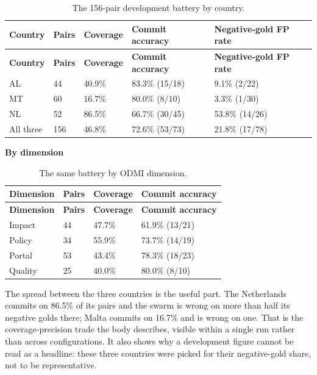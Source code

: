 {\small
\begin{longtable}[]{@{}
  L{0.1476}
  L{0.1082}
  L{0.1476}
  L{0.2952}
  L{0.2952}@{}}
\caption{The 156-pair development battery by country.}\label{tab:dev-by-country}\\
\toprule\noalign{}
\textbf{Country} & \textbf{Pairs} & \textbf{Coverage} & \textbf{Commit accuracy} & \textbf{Negative-gold FP rate} \\
\midrule\noalign{}
\endfirsthead
\toprule\noalign{}
\textbf{Country} & \textbf{Pairs} & \textbf{Coverage} & \textbf{Commit accuracy} & \textbf{Negative-gold FP rate} \\
\midrule\noalign{}
\endhead
\bottomrule\noalign{}
\endlastfoot
AL & 44 & 40.9\% & 83.3\% (15/18) & 9.1\% (2/22) \\
MT & 60 & 16.7\% & 80.0\% (8/10) & 3.3\% (1/30) \\
NL & 52 & 86.5\% & 66.7\% (30/45) & 53.8\% (14/26) \\
All three & 156 & 46.8\% & 72.6\% (53/73) & 21.8\% (17/78) \\
\end{longtable}
}


\textbf{By dimension}

{\small
\begin{longtable}[]{@{}
  L{0.1966}
  L{0.1376}
  L{0.1868}
  L{0.3932}@{}}
\caption{The same battery by ODMI dimension.}\label{tab:dev-by-dimension}\\
\toprule\noalign{}
\textbf{Dimension} & \textbf{Pairs} & \textbf{Coverage} & \textbf{Commit accuracy} \\
\midrule\noalign{}
\endfirsthead
\toprule\noalign{}
\textbf{Dimension} & \textbf{Pairs} & \textbf{Coverage} & \textbf{Commit accuracy} \\
\midrule\noalign{}
\endhead
\bottomrule\noalign{}
\endlastfoot
Impact & 44 & 47.7\% & 61.9\% (13/21) \\
Policy & 34 & 55.9\% & 73.7\% (14/19) \\
Portal & 53 & 43.4\% & 78.3\% (18/23) \\
Quality & 25 & 40.0\% & 80.0\% (8/10) \\
\end{longtable}
}


The spread between the three countries is the useful part. The Netherlands commits on 86.5\% of its pairs and the swarm is wrong on more than half its negative golds there; Malta commits on 16.7\% and is wrong on one. That is the coverage-precision trade the body describes, visible within a single run rather than across configurations. It also shows why a development figure cannot be read as a headline: these three countries were picked for their negative-gold share, not to be representative.

